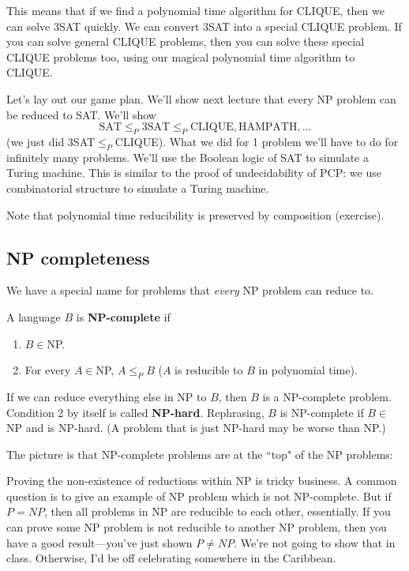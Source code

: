 This means that if we find a polynomial time algorithm for CLIQUE, then we can solve 3SAT quickly. We can convert 3SAT into a special CLIQUE problem. If you can solve general CLIQUE problems, then you can solve these special CLIQUE problems too, using our magical polynomial time algorithm to CLIQUE.

Let's lay out our game plan. We'll show next lecture that every NP problem can be reduced to SAT. We'll show 
\[
\text{SAT}\le_P \text{3SAT}\le_P\text{CLIQUE}, \text{HAMPATH},\ldots
\]
(we just did 3SAT$\le_P$CLIQUE). 
What we did for 1 problem we'll have to do for infinitely many problems. We'll use the Boolean logic of SAT to simulate a Turing machine.
This is similar to the proof of undecidability of PCP: we use combinatorial structure to simulate a Turing machine.

Note that polynomial time reducibility is preserved by composition (exercise). 
\subsection{NP completeness}
We have a special name for problems that {\it every} NP problem can reduce to.
\begin{df}
A language $B$ is \textbf{NP-complete} if
\begin{enumerate}
\item
$B\in$NP.
\item
For every $A\in $NP, $A\le_PB$ ($A$ is reducible to $B$ in polynomial time).
\end{enumerate}
\end{df}
If we can reduce everything else in NP to $B$, then $B$ is a NP-complete problem. Condition 2 by itself is called \textbf{NP-hard}. Rephrasing, $B$ is NP-complete if $B\in$NP and is NP-hard. (A problem that is just NP-hard may be worse than NP.)

The picture is that NP-complete problems are at the ``top" of the NP problems:


Proving the non-existence of reductions within NP is tricky business. A common question is to give an example of NP problem which is not NP-complete. But if $P=NP$, then all problems in NP are reducible to each other, essentially. If you can prove some NP problem is not reducible to another NP problem, then you have a good result---you've just shown $P\ne NP$. 
We're not going to show that in class.
Otherwise, I'd be off celebrating somewhere in the Caribbean.

